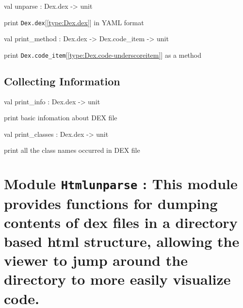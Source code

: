 \documentclass[11pt]{article}
\begin{document}
\label{val:Unparse.unparse}\begin{ocamldoccode}
val unparse : Dex.dex -> unit
\end{ocamldoccode}
\begin{ocamldocdescription}
print {\tt{Dex.dex}}[\ref{type:Dex.dex}] in YAML format


\end{ocamldocdescription}




\label{val:Unparse.print-underscoremethod}\begin{ocamldoccode}
val print_method : Dex.dex -> Dex.code_item -> unit
\end{ocamldoccode}
\begin{ocamldocdescription}
print {\tt{Dex.code\_item}}[\ref{type:Dex.code-underscoreitem}] as a method


\end{ocamldocdescription}




\subsection{Collecting Information}




\label{val:Unparse.print-underscoreinfo}\begin{ocamldoccode}
val print_info : Dex.dex -> unit
\end{ocamldoccode}
\begin{ocamldocdescription}
print basic infomation about DEX file


\end{ocamldocdescription}




\label{val:Unparse.print-underscoreclasses}\begin{ocamldoccode}
val print_classes : Dex.dex -> unit
\end{ocamldoccode}
\begin{ocamldocdescription}
print all the class names occurred in DEX file


\end{ocamldocdescription}


\section{Module {\tt{Htmlunparse}} : This module provides functions for dumping contents of dex files in 
    a directory based html structure, allowing the viewer to jump around 
    the directory to more easily visualize code.}
\label{module:Htmlunparse}
\end{document}
